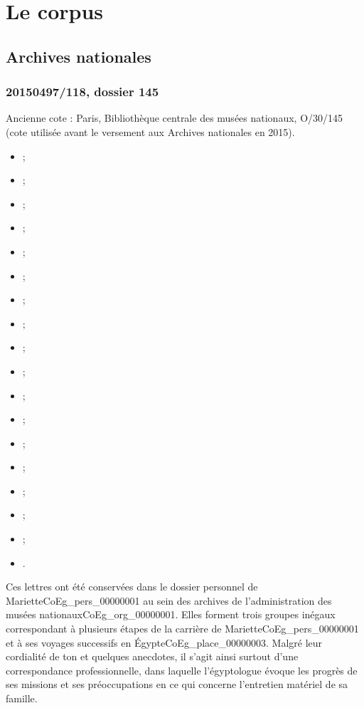 \documentclass{book}
\begin{document}
\section*{Le corpus}
\subsection*{Archives nationales}
\subsubsection*{20150497/118, dossier 145}
\label{CoEg_Mariette_ms_001}
\noindent Ancienne cote : Paris, Bibliothèque centrale des musées nationaux, O/30/145 (cote utilisée avant le versement aux Archives nationales en 2015).
\begin{itemize}
\item {} ;
\item {} ;
\item {} ;
\item {} ;
\item {} ;
\item {} ;
\item {} ;
\item {} ;
\item {} ;
\item {} ;
\item {} ;
\item {} ;
\item {} ;
\item {} ;
\item {} ;
\item {} ;
\item {} ;
\item {}.
\end{itemize} \par
Ces lettres ont été conservées dans le dossier personnel de Mariette\gls{CoEg_pers_00000001} au sein des archives de l'administration des musées nationaux\gls{CoEg_org_00000001}. Elles forment trois groupes inégaux correspondant à plusieurs étapes de la carrière de Mariette\gls{CoEg_pers_00000001} et à ses voyages successifs en Égypte\gls{CoEg_place_00000003}. Malgré leur cordialité de ton et quelques anecdotes, il s’agit ainsi surtout d’une correspondance professionnelle, dans laquelle l’égyptologue évoque les progrès de ses missions et ses préoccupations en ce qui concerne l’entretien matériel de sa famille.\par
\end{document}
